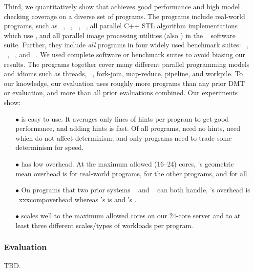Third, we quantitatively show that \parrot achieves good performance and high
model checking coverage on a diverse set of \nprog programs.  The programs
include \nrealprog real-world programs, such as \bdb~\cite{berkeleydb},
\openldap~\cite{openldap}, \redis~\cite{redis}, \mplayer~\cite{mplayer},
all \nstl parallel C++ STL algorithm 
implementations~\cite{parallel-stl} which use \openmp, and all \nimagick
parallel image processing utilities (also \openmp) in the \imagick~\cite{
imagick}
software suite.  Further, they
include \emph{all} \nbenchmarks programs in four widely used benchmark suites:
\parsec~\cite{parsec}, \phoenix~\cite{phoenix-benchmarks}, \splashx~\cite{
splashx},
and \npb~\cite{npb}.  We used complete software or benchmark suites to
avoid biasing our results. The programs together cover many different
parallel programming models and idioms such as threads,
\openmp~\cite{openmp}, fork-join, map-reduce, pipeline, and workpile.  To
our knowledge, our
evaluation uses roughly \overeach more programs than any prior
DMT or \smt evaluation, and \overcombined more than all
prior evaluations combined.
Our experiments show:

\begin{enumerate}

\item[$\bullet$] \parrot is easy to use. It averages only \hintsperprog lines of hints
  per program to get good performance, and adding hints is fast.  Of all
  \nprog programs, \nprognohints need no hints, \nproglineuphints need
  \computes which do not affect determinism, and only \nprognondethints
  programs need \nondets to trade some determinism for speed.

\item[$\bullet$] \parrot has low overhead.  At the maximum allowed (16--24) cores, \parrot's
  geometric mean overhead is \meanrealoverhead for \nrealprog real-world 
programs,
  \meanbenchoverhead for the other \nbenchmarks programs, and \meanoverhead 
for all.

\item[$\bullet$] On \nprogcompared programs that two prior systems \dthreads~\cite{
dthreads:sosp11}
  and \coredet~\cite{coredet:asplos10} can both handle, \parrot's overhead is \
xxxcompoverhead whereas \dthreads's
  is \dthreadssyncoverhead and \coredet's \coredetoverhead.

\item[$\bullet$] \parrot scales well to the maximum allowed cores on our 24-core server and
  to at least three different scales/types of workloads per program.

\end{enumerate}

\subsubsection{Evaluation} \label{sec:parrot-eval}
TBD.

